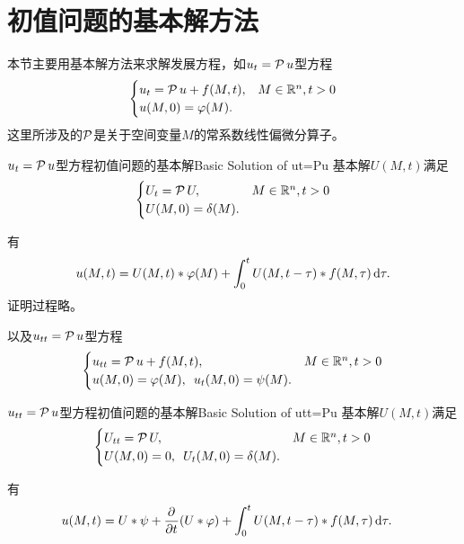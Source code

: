 \section{初值问题的基本解方法}
本节主要用基本解方法来求解发展方程，如$u_t = \operatorname{\mathcal P} u$型方程
\begin{align}
	\begin{cases}
		u_t = \operatorname{\mathcal P} u + f(M,t),&M \in \mathbb{R}^n,t > 0\\
		u(M,0) = \varphi(M).
	\end{cases}
\end{align}
这里所涉及的$\operatorname{\mathcal P}$是关于空间变量$M$的常系数线性偏微分算子。

\begin{definition}{$u_t = \operatorname{\mathcal P} u$型方程初值问题的基本解}{Basic Solution of ut=Pu}
	基本解$U(M,t)$满足
	\begin{align}
		\begin{cases}
			U_t = \operatorname{\mathcal P} U,&M \in \mathbb{R}^n,t > 0\\
			U(M,0) = \delta(M).
		\end{cases}
	\end{align}
\end{definition}
有
\begin{align}
	u(M,t) = U(M,t) \ast \varphi(M) + \int_0^tU(M,t - \tau) \ast f(M,\tau)\mathop{}\!\mathrm{d}\tau.
\end{align}
证明过程略。

以及$u_{tt} = \operatorname{\mathcal P} u$型方程
\begin{align}
	\begin{cases}
		u_{tt} = \operatorname{\mathcal P} u + f(M,t),&M \in \mathbb{R}^n,t > 0\\
		u(M,0) = \varphi(M),\enspace u_t(M,0) = \psi(M).
	\end{cases}
\end{align}
\begin{definition}{$u_{tt} = \operatorname{\mathcal P} u$型方程初值问题的基本解}{Basic Solution of utt=Pu}
	基本解$U(M,t)$满足
	\begin{align}
		\begin{cases}
			U_{tt} = \operatorname{\mathcal P} U,&M \in \mathbb{R}^n,t > 0\\
			U(M,0) = 0,\enspace U_t(M,0) = \delta(M).
		\end{cases}
	\end{align}
\end{definition}
有
\begin{align}
	\begin{aligned}
		u(M,t) =&\;U \ast \psi + \frac{\partial^{}}{\partial{t}^{}}(U \ast \varphi) + \int_0^tU(M,t - \tau) \ast f(M,\tau)\mathop{}\!\mathrm{d}\tau.
	\end{aligned}
\end{align}
